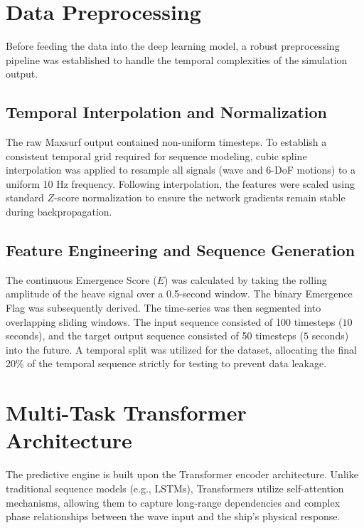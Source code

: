 \section{Data Preprocessing}
Before feeding the data into the deep learning model, a robust preprocessing pipeline was established to handle the temporal complexities of the simulation output.

\subsection{Temporal Interpolation and Normalization}
The raw Maxsurf output contained non-uniform timesteps. To establish a consistent temporal grid required for sequence modeling, cubic spline interpolation was applied to resample all signals (wave and 6-DoF motions) to a uniform 10 Hz frequency. Following interpolation, the features were scaled using standard $Z$-score normalization to ensure the network gradients remain stable during backpropagation.

\subsection{Feature Engineering and Sequence Generation}
The continuous Emergence Score ($E$) was calculated by taking the rolling amplitude of the heave signal over a 0.5-second window. The binary Emergence Flag was subsequently derived. The time-series was then segmented into overlapping sliding windows. The input sequence consisted of 100 timesteps ($10$ seconds), and the target output sequence consisted of 50 timesteps ($5$ seconds) into the future. A temporal split was utilized for the dataset, allocating the final 20\% of the temporal sequence strictly for testing to prevent data leakage.

\section{Multi-Task Transformer Architecture}
The predictive engine is built upon the Transformer encoder architecture. Unlike traditional sequence models (e.g., LSTMs), Transformers utilize self-attention mechanisms, allowing them to capture long-range dependencies and complex phase relationships between the wave input and the ship's physical response.

